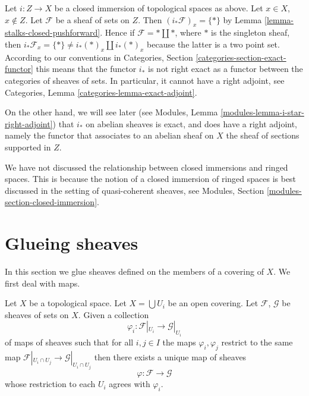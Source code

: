\begin{remark}
\label{remark-i-star-not-exact}
Let $i : Z \to X$ be a closed immersion of topological spaces as above.
Let $x \in X$, $x \not \in Z$. Let $\mathcal{F}$ be a sheaf of sets
on $Z$. Then $(i_*\mathcal{F})_x = \{ * \}$
by Lemma \ref{lemma-stalks-closed-pushforward}.
Hence if $\mathcal{F} = * \amalg *$, where
$*$ is the singleton sheaf, then
$i_*\mathcal{F}_x = \{*\} \not = i_*(*)_x \amalg i_*(*)_x$
because the latter is a two point set.
According to our conventions in
Categories, Section \ref{categories-section-exact-functor}
this means that the functor $i_*$ is not right exact
as a functor between the categories of sheaves of sets.
In particular, it cannot have a right adjoint, see
Categories, Lemma \ref{categories-lemma-exact-adjoint}.

\medskip\noindent
On the other hand, we will see later (see
Modules, Lemma \ref{modules-lemma-i-star-right-adjoint})
that $i_*$ on abelian sheaves is exact, and does have a right
adjoint, namely the functor that associates to an abelian sheaf on $X$
the sheaf of sections supported in $Z$.
\end{remark}

\begin{remark}
\label{remark-closed-immersion-spaces}
We have not discussed the relationship between closed immersions
and ringed spaces. This is because the notion of a closed immersion
of ringed spaces is best discussed in the setting of quasi-coherent
sheaves, see Modules, Section \ref{modules-section-closed-immersion}.
\end{remark}

\section{Glueing sheaves}
\label{section-glueing-sheaves}

\noindent
In this section we glue sheaves defined on the members of a covering of $X$.
We first deal with maps.

\begin{lemma}
\label{lemma-glue-maps}
Let $X$ be a topological space.
Let $X = \bigcup U_i$ be an open covering.
Let $\mathcal{F}$, $\mathcal{G}$ be sheaves of sets on $X$.
Given a collection
$$
\varphi_i :
\mathcal{F}|_{U_i}
\longrightarrow
\mathcal{G}|_{U_i}
$$
of maps of sheaves such that for all $i, j \in I$ the maps
$\varphi_i, \varphi_j$ restrict to the same map
$\mathcal{F}|_{U_i \cap U_j} \to \mathcal{G}|_{U_i \cap U_j}$
then there exists a unique map of sheaves
$$
\varphi :
\mathcal{F}
\longrightarrow
\mathcal{G}
$$
whose restriction to each $U_i$ agrees with $\varphi_i$.
\end{lemma}

